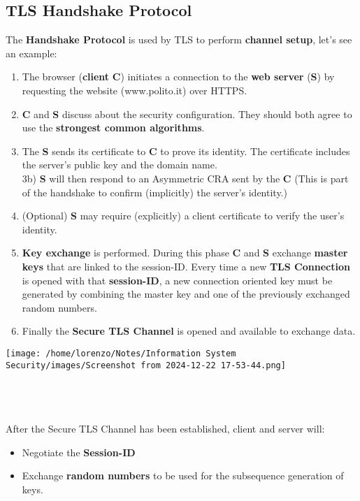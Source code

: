 \subsection{TLS Handshake Protocol}
\begin{minipage}{0.6\textwidth}
    The \textbf{Handshake Protocol} is used by TLS to perform \textbf{channel setup}, let's see an example:
    \begin{enumerate}
        \item The browser (\textbf{client} \textbf{C}) initiates a connection to the \textbf{web server} (\textbf{S}) by requesting the website
        (www.polito.it) over HTTPS.
        \item \textbf{C} and \textbf{S} discuss about the security configuration. They should both agree to use the \textbf{strongest common algorithms}.
        \item The \textbf{S} sends its certificate to \textbf{C} to prove its identity. The certificate includes the server’s public key and the domain name.\\
        3b) \textbf{S} will then respond to an Asymmetric CRA sent by the \textbf{C} (This is part of the handshake to confirm (implicitly)
        the server’s identity.)
        \item (Optional) \textbf{S} may require (explicitly) a client certificate to verify
        the user’s identity.
        \item \textbf{Key exchange} is performed. During this phase \textbf{C} and \textbf{S} exchange \textbf{master keys} that are linked to the session-ID. Every time a new \textbf{TLS Connection} is opened with that \textbf{session-ID}, a new connection oriented key must be generated by combining the master key and one of the previously exchanged random numbers. 
        \item Finally the \textbf{Secure TLS Channel} is opened and available to exchange data. 
    \end{enumerate}
\end{minipage} 
\hspace{0.1cm}
\begin{minipage}{0.5\textwidth}
    \texttt{[image: /home/lorenzo/Notes/Information System Security/images/Screenshot from 2024-12-22 17-53-44.png]}
\end{minipage}
\noindent
\\
\\
\\
After the Secure TLS Channel has been established, client and server will: 
\begin{itemize}
    \item Negotiate the \textbf{Session-ID}
    \item Exchange \textbf{random numbers} to be used for the subsequence generation of keys.
\end{itemize}
